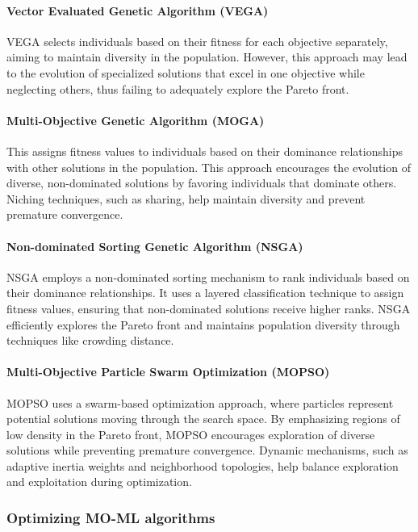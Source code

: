 \paragraph{Vector Evaluated Genetic Algorithm (VEGA)} VEGA selects individuals based on their fitness for each objective separately, aiming to maintain diversity in the population. However, this approach may lead to the evolution of specialized solutions that excel in one objective while neglecting others, thus failing to adequately explore the Pareto front.

\paragraph{Multi-Objective Genetic Algorithm (MOGA)} This assigns fitness values to individuals based on their dominance relationships with other solutions in the population. This approach encourages the evolution of diverse, non-dominated solutions by favoring individuals that dominate others. Niching techniques, such as sharing, help maintain diversity and prevent premature convergence.

\paragraph{Non-dominated Sorting Genetic Algorithm (NSGA)} NSGA employs a non-dominated sorting mechanism to rank individuals based on their dominance relationships. It uses a layered classification technique to assign fitness values, ensuring that non-dominated solutions receive higher ranks. NSGA efficiently explores the Pareto front and maintains population diversity through techniques like crowding distance.

\paragraph{Multi-Objective Particle Swarm Optimization (MOPSO)} MOPSO uses a swarm-based optimization approach, where particles represent potential solutions moving through the search space. By emphasizing regions of low density in the Pareto front, MOPSO encourages exploration of diverse solutions while preventing premature convergence. Dynamic mechanisms, such as adaptive inertia weights and neighborhood topologies, help balance exploration and exploitation during optimization.

\subsubsection{Optimizing MO-ML algorithms}

